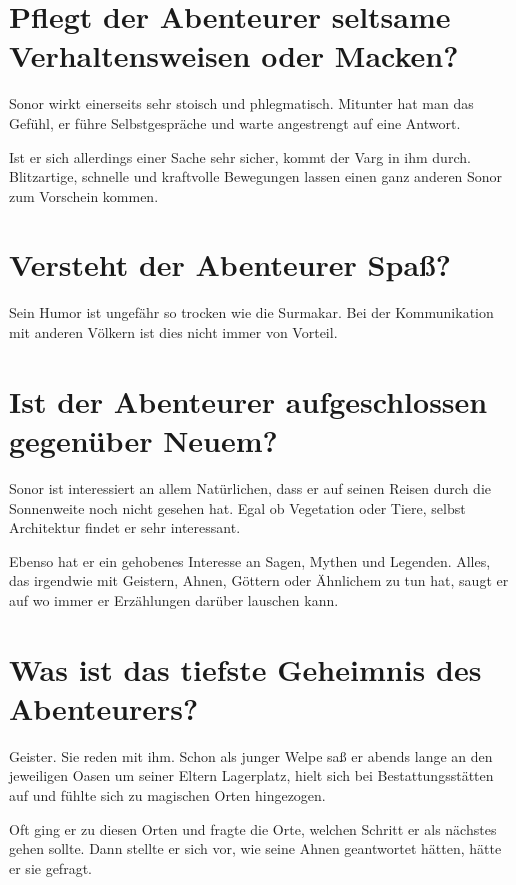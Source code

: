 	\section[Macken]{Pflegt der Abenteurer seltsame Verhaltensweisen oder Macken?}

	Sonor wirkt einerseits sehr stoisch und phlegmatisch.
	Mitunter hat man das Gefühl, er führe Selbstgespräche und warte
	angestrengt auf eine Antwort.

	Ist er sich allerdings einer Sache sehr sicher, kommt der Varg in ihm
	durch. Blitzartige, schnelle und kraftvolle Bewegungen lassen einen ganz
	anderen Sonor zum Vorschein kommen.
	

	\section[Humor]{Versteht der Abenteurer Spaß?}
	

	Sein Humor ist ungefähr so trocken wie die Surmakar. Bei der
	Kommunikation mit anderen Völkern ist dies nicht immer von Vorteil.


	\section[Aufgeschlossenheit]{Ist der Abenteurer aufgeschlossen gegenüber Neuem?}
	

	Sonor ist interessiert an allem Natürlichen, dass er auf seinen Reisen
	durch die Sonnenweite noch nicht gesehen hat. Egal ob Vegetation oder
	Tiere, selbst Architektur findet er sehr interessant.

	Ebenso hat er ein gehobenes Interesse an Sagen, Mythen und Legenden.
	Alles, das irgendwie mit Geistern, Ahnen, Göttern oder Ähnlichem zu tun
	hat, saugt er auf wo immer er Erzählungen darüber lauschen kann.


	\section[Top Secret]{Was ist das tiefste Geheimnis des Abenteurers?}
	

	Geister. Sie reden mit ihm. Schon als junger Welpe saß er abends lange
	an den jeweiligen Oasen um seiner Eltern Lagerplatz, hielt sich bei
	Bestattungsstätten auf und fühlte sich zu magischen Orten hingezogen.

	Oft ging er zu diesen Orten und fragte die Orte, welchen Schritt er als
	nächstes gehen sollte. Dann stellte er sich vor, wie seine Ahnen
	geantwortet hätten, hätte er sie gefragt.

